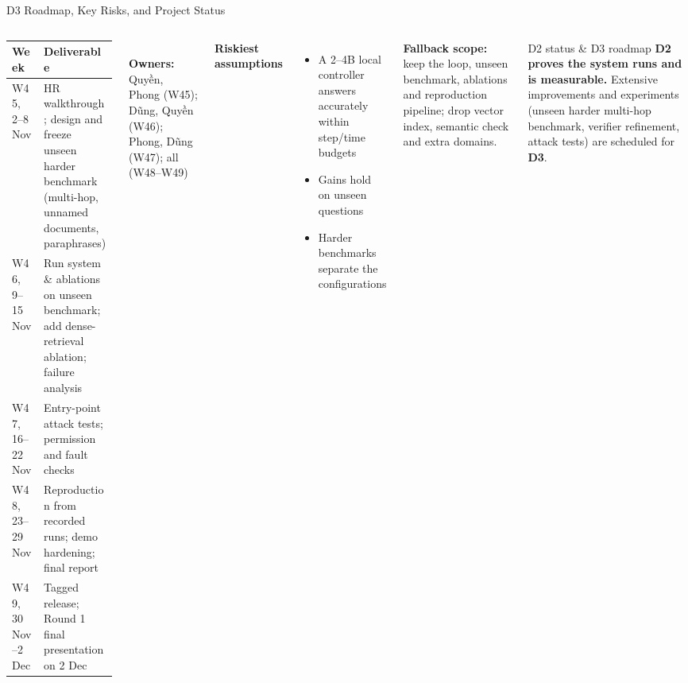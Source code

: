 \documentclass[aspectratio=1610,11pt]{beamer}
\renewcommand{\arraystretch}{1.15}
\begin{document}
\begin{frame}{D3 Roadmap, Key Risks, and Project Status}
  \begin{columns}[T]
    \scriptsize\renewcommand{\arraystretch}{1.15}
    \begin{tabularx}{\linewidth}{@{}>{\raggedright\arraybackslash}p{2.25cm}>{\raggedright\arraybackslash}X@{}}
      \toprule Week & Deliverable\\\midrule
      W45, 2--8 Nov & HR walkthrough; design and freeze unseen harder benchmark (multi-hop, unnamed documents, paraphrases)\\
      W46, 9--15 Nov & Run system \& ablations on unseen benchmark; add dense-retrieval ablation; failure analysis\\
      W47, 16--22 Nov & Entry-point attack tests; permission and fault checks\\
      W48, 23--29 Nov & Reproduction from recorded runs; demo hardening; final report\\
      W49, 30 Nov--2 Dec & Tagged release; Round 1 final presentation on 2 Dec\\
      \bottomrule
    \end{tabularx}\\[4pt]
    \footnotesize \textbf{Owners:} Quyền, Phong (W45); Dũng, Quyền (W46); Phong, Dũng (W47); all (W48--W49)

    \footnotesize
    \textbf{Riskiest assumptions}
    \begin{itemize}
      \item A 2--4B local controller answers accurately within step/time budgets
      \item Gains hold on unseen questions
      \item Harder benchmarks separate the configurations
    \end{itemize}
    \vspace{2pt}
    \textbf{Fallback scope:} keep the loop, unseen benchmark, ablations and reproduction pipeline; drop vector index, semantic check and extra domains.
    \vspace{4pt}

    \begin{block}{D2 status \& D3 roadmap}
      \scriptsize \textbf{D2 proves the system runs and is measurable.} Extensive improvements and experiments (unseen harder multi-hop benchmark, verifier refinement, attack tests) are scheduled for \textbf{D3}.
    \end{block}
  \end{columns}
\end{frame}
\end{document}
